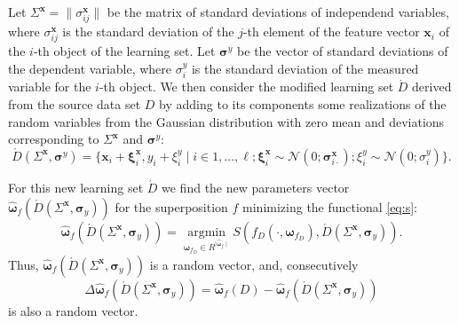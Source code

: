 \documentclass[11pt,a4paper]{article}
\theoremstyle{definition}
\begin{document}
Let $\Sigma^{\mathbf{x}} = \| \sigma^{\mathbf{x}}_{ij} \|$ be the matrix of
standard deviations of independend variables, where $\sigma^{\mathbf{x}}_{ij}$
is the standard deviation of the $j$-th element of the feature vector
$\mathbf{x}_i$ of the $i$-th object of the learning set. Let $\boldsymbol{\sigma}^y$
be the vector of standard deviations of the dependent variable, where $\sigma^y_i$
is the standard deviation of the measured variable for the $i$-th object.
We then consider the modified learning set $\acute{D}$ derived from the
source data set $D$ by adding to its components some realizations of the
random variables from the Gaussian distribution with zero mean and 
deviations corresponding to $\Sigma^{\mathbf{x}}$ and $\boldsymbol{\sigma}^y$:
\begin{equation}
  \acute{D}(\Sigma^{\mathbf{x}}, \boldsymbol{\sigma}^y) = \{ \mathbf{x}_i + \boldsymbol{\xi}^{\mathbf{x}}_i, y_i + \xi^y_i \mid i \in 1, \dots, \ell; \boldsymbol{\xi}^{\mathbf{x}}_i \sim \mathcal{N}(0; \boldsymbol{\sigma}^{\mathbf{x}}_{i \cdot}); \xi^y_i \sim \mathcal{N}(0; \sigma^y_i) \}.
  \label{eq:d_acute}
\end{equation}

For this new learning set $\acute{D}$ we find the new parameters vector $\hat{\boldsymbol{\omega}}_f (\acute{D} (\Sigma^{\mathbf{x}}, \boldsymbol{\sigma}_y))$
for the superposition $f$ minimizing the functional \eqref{eq:s}:
\begin{equation}
  \hat{\boldsymbol{\omega}}_f (\acute{D} (\Sigma^{\mathbf{x}}, \boldsymbol{\sigma}_y)) = \mathop{\arg \min}\limits_{\boldsymbol{\omega}_{f_D} \in R^{\mid \hat{\boldsymbol{\omega}}_f \mid}} S (f_D (\cdot, \boldsymbol{\omega}_{f_D}), \acute{D} (\Sigma^{\mathbf{x}}, \boldsymbol{\sigma}_y)).
  \label{eq:hat_omega}
\end{equation}
Thus, $\hat{\boldsymbol{\omega}}_f (\acute{D} (\Sigma^{\mathbf{x}}, \boldsymbol{\sigma}_y))$ is
a random vector, and, consecutively
\[
  \Delta\hat{\boldsymbol{\omega}}_f(\acute{D} (\Sigma^{\mathbf{x}}, \boldsymbol{\sigma}_y) ) = \hat{\boldsymbol{\omega}}_f(D) - \hat{\boldsymbol{\omega}}_f (\acute{D} (\Sigma^{\mathbf{x}}, \boldsymbol{\sigma}_y))
\]
is also a random vector.
\end{document}
